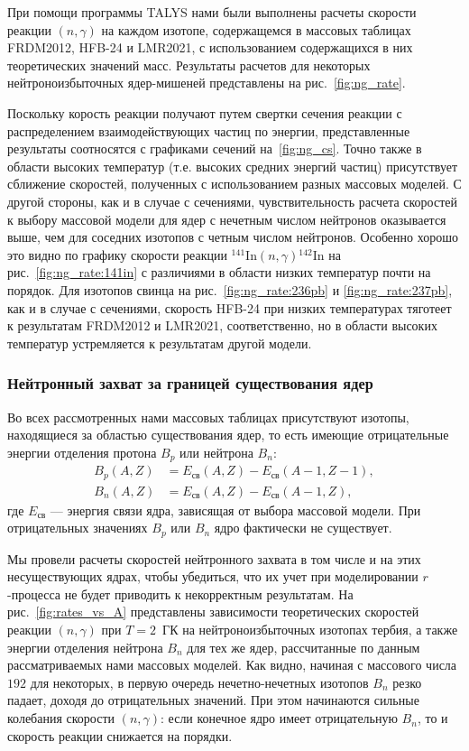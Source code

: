 При помощи программы TALYS нами были выполнены расчеты скорости реакции $(n,\gamma)$ на каждом изотопе, содержащемся в массовых таблицах FRDM2012, HFB-24 и LMR2021, с использованием содержащихся в них теоретических значений масс. Результаты расчетов для некоторых нейтроноизбыточных ядер-мишеней представлены на рис.~\ref{fig:ng_rate}. 

Поскольку корость реакции получают путем свертки сечения реакции с распределением взаимодействующих частиц по энергии, представленные результаты соотносятся с графиками сечений на~\ref{fig:ng_cs}. Точно также в области высоких температур (т.е. высоких средних энергий частиц) присутствует сближение скоростей, полученных с использованием разных массовых моделей. С другой стороны, как и в случае с сечениями, чувствительность расчета скоростей к выбору массовой модели для ядер с нечетным числом нейтронов оказывается выше, чем для соседних изотопов с четным числом нейтронов. Особенно хорошо это видно по графику скорости реакции ${}^{141}\text{In}(n,\gamma){}^{142}\text{In}$ на рис.~\ref{fig:ng_rate:141in} с различиями в области низких температур почти на порядок. Для изотопов свинца на рис.~\ref{fig:ng_rate:236pb} и \ref{fig:ng_rate:237pb}, как и в случае с сечениями, скорость HFB-24 при низких температурах тяготеет к результатам FRDM2012 и LMR2021, соответственно, но в области высоких температур устремляется к результатам другой модели.

\subsubsection{Нейтронный захват за границей существования ядер}
Во всех рассмотренных нами массовых таблицах присутствуют изотопы, находящиеся за областью существования ядер, то есть имеющие отрицательные энергии отделения протона $B_p$ или нейтрона $B_n$:
\begin{equation}\begin{aligned}\label{eq:driplines}
B_p(A,Z) &= E_{\text{св}}(A,Z) - E_{\text{св}}(A-1,Z-1),\\
B_n(A,Z) &= E_{\text{св}}(A,Z) - E_{\text{св}}(A-1,Z),
\end{aligned}\end{equation}
где $E_{\text{св}}$ --- энергия связи ядра, зависящая от выбора массовой модели. При отрицательных значениях $B_p$ или $B_n$ ядро фактически не существует. 

Мы провели расчеты скоростей нейтронного захвата в том числе и на этих несуществующих ядрах, чтобы убедиться, что их учет при моделировании $r$-процесса не будет приводить к некорректным результатам. На рис.~\ref{fig:rates_vs_A} представлены зависимости теоретических скоростей реакции $(n,\gamma)$ при $T = 2$~ГК на нейтроноизбыточных изотопах тербия, а также энергии отделения нейтрона $B_n$ для тех же ядер, рассчитанные по данным рассматриваемых нами массовых моделей. Как видно, начиная с массового числа $192$ для некоторых, в первую очередь нечетно-нечетных изотопов $B_n$ резко падает, доходя до отрицательных значений. При этом начинаются сильные колебания скорости $(n,\gamma)$: если конечное ядро имеет отрицательную $B_n$, то и скорость реакции снижается на порядки. 

